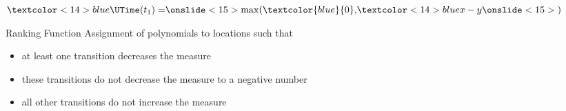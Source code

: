 \begin{overprint}
  \centering
  $\textcolor<14>{blue}{\UTime(t_1) = }\onslide<15>{\max(\textcolor{blue}{0},}\textcolor<14>{blue}{x-y}\onslide<15>{)}$

  \begin{block}{Ranking Function}
    Assignment of polynomials to locations such that
    \begin{itemize}
    \item<17-> at least one transition decreases the measure
    \item<18-> these transitions do not decrease the measure to a negative number
    \item<19-> all other transitions do not increase the measure
    \end{itemize}
  \end{block}
\end{overprint}
